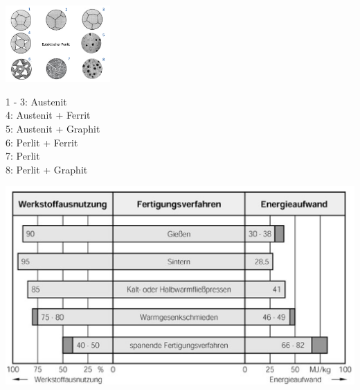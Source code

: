 \begin{minipage}{0.6\linewidth}
    \includegraphics[width = 40mm]{src/images/Kreisli.png}
\end{minipage}
\begin{minipage}{0.4\linewidth}
    1 - 3: Austenit\\
    4: Austenit + Ferrit\\
    5: Austenit + Graphit\\
    6: Perlit + Ferrit\\
    7: Perlit\\
    8: Perlit + Graphit\\
\end{minipage}
\begin{center}
    \includegraphics[width=0.6\linewidth]{src/images/Energieaufwand.png}
\end{center}

